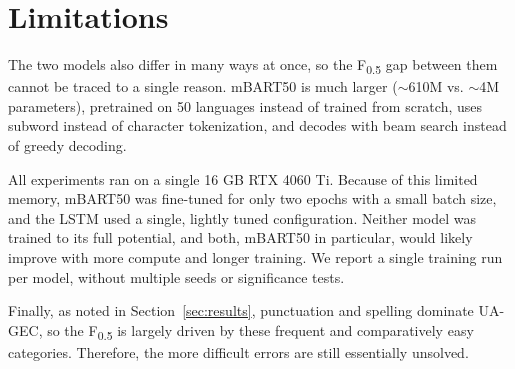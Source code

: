 \documentclass[11pt]{article}
\begin{document}
\section{Limitations}


The two models also differ in many ways at once, so the F\textsubscript{0.5} gap between them cannot be traced to a single reason. mBART50 is much larger ($\sim$610M vs. $\sim$4M parameters), pretrained on 50 languages instead of trained from scratch, uses subword instead of character tokenization, and decodes with beam search instead of greedy decoding.

All experiments ran on a single 16 GB RTX 4060 Ti. Because of this limited memory, mBART50 was fine-tuned for only two epochs with a small batch size, and the LSTM used a single, lightly tuned configuration. Neither model was trained to its full potential, and both, mBART50 in particular, would likely improve with more compute and longer training. We report a single training run per model, without multiple seeds or significance tests.

Finally, as noted in Section~\ref{sec:results}, punctuation and spelling dominate UA-GEC, so the F\textsubscript{0.5} is largely driven by these frequent and comparatively easy categories. Therefore, the more difficult errors are still essentially unsolved.

\nocite{*}


\end{document}
